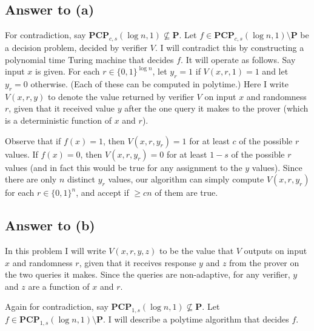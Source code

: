 \documentclass{article}
\renewcommand{\P}{\mathbf{P}}
\begin{document}
\subsection*{Answer to (a)}
For contradiction, say $\mathbf{PCP}_{c, s}(\log n, 1) \not\subseteq \P$.
Let $f \in \mathbf{PCP}_{c, s}(\log n, 1) \setminus \P$ be a decision problem,
decided by verifier $V$.
I will contradict this by constructing a polynomial time Turing machine that decides $f$.
It will operate as follows.  Say input $x$ is given.
For each $r \in \{0, 1\}^{\log n}$, let $y_r = 1$ if $V(x, r, 1) = 1$ and let $y_r = 0$ otherwise. (Each of these can be computed in polytime.) Here I write $V(x, r, y)$ to denote the value returned by verifier $V$ on input $x$ and randomness $r$, given that it received value $y$ after the one query it makes to the prover (which is a deterministic function of $x$ and $r$).

Observe that if $f(x) = 1$, then $V(x, r, y_r) = 1$ for at least $c$ of the possible $r$ values.
If $f(x) = 0$, then $V(x, r, y_r) = 0$ for at least $1 - s$ of the possible $r$ values (and in fact this would be true for any assignment to the $y$ values).
Since there are only $n$ distinct $y_r$ values, our algorithm can simply compute $V(x, r, y_r)$ for each $r \in \{0, 1\}^n$, and accept if $\geq cn$ of them are true.

\subsection*{Answer to (b)}
In this problem I will write $V(x, r, y, z)$ to be the value that $V$ outputs on input $x$ and randomness $r$, given that it receives response $y$ and $z$ from the prover on the two queries it makes.  Since the queries are non-adaptive, for any verifier, $y$ and $z$ are a function of $x$ and $r$.

Again for contradiction, say $\mathbf{PCP}_{1, s}(\log n, 1) \not\subseteq \P$.
Let $f \in \mathbf{PCP}_{1, s}(\log n, 1) \setminus \P$.
I will describe a polytime algorithm that decides $f$.
\end{document}
